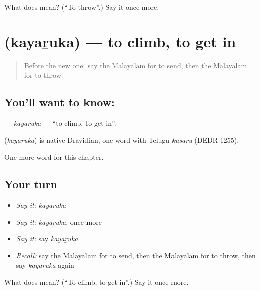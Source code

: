\begin{tcolorbox}[breakable,colback=teal!4,colframe=teal!35!black,title={Before you move on}]
What does  mean? (\textquotedblleft{}To throw\textquotedblright{}.) Say it once more.
\end{tcolorbox}
\section[\texorpdfstring{\ml{കയറുക} (kayaṟuka)}{കയറുക (kayaṟuka)}]{ (kayaṟuka) — to climb, to get in}

\label{lesson:ML-C175-kayaruka}



\begin{quote}
Before the new one: say the Malayalam for to send, then the Malayalam for to throw.
\end{quote}

\subsection*{You'll want to know: }
\textbf{} — \emph{kayaṟuka} — \textquotedblleft{}to climb, to get in\textquotedblright{}.

\begin{cousinweb}
\textbf{} (\emph{kayaṟuka}) is native Dravidian, one word with Telugu \emph{kasaru} (DEDR 1255).
\end{cousinweb}

\begin{grammarlens}[title={What you've built}]
One more word for this chapter.
\end{grammarlens}

\subsection*{Your turn}
\begin{itemize}
\raggedright
  \item \emph{Say it:} \emph{kayaṟuka}
  \item \emph{Say it:} \emph{kayaṟuka}, once more
  \item \emph{Say it:} say \emph{kayaṟuka}
  \item \emph{Recall:} say the Malayalam for to send, then the Malayalam for to throw, then say \emph{kayaṟuka} again
\end{itemize}

\begin{tcolorbox}[breakable,colback=teal!4,colframe=teal!35!black,title={Before you move on}]
What does  mean? (\textquotedblleft{}To climb, to get in\textquotedblright{}.) Say it once more.
\end{tcolorbox}
